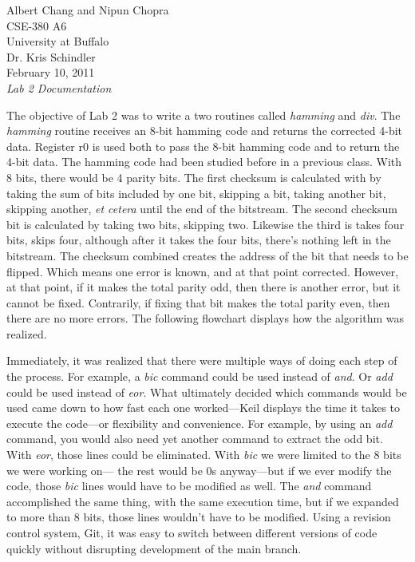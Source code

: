 \documentclass[letterpaper,10pt]{article}
\begin{document}
    Albert Chang and Nipun Chopra\\ CSE-380 A6\\
    University at Buffalo\\
    Dr. Kris Schindler\\
    February 10, 2011\\
    \textit{Lab 2 Documentation}

    The objective of Lab 2 was to write a two routines called \textit{hamming}
    and \textit{div}. The \textit{hamming} routine receives an 8-bit hamming
    code and returns the corrected 4-bit data. Register r0 is used both to
    pass the 8-bit hamming code and to return the 4-bit data. The hamming
    code had been studied before in a previous class. With 8 bits, there would
    be 4 parity bits. The first checksum is calculated with by taking the
    sum of bits included by one bit, skipping a bit, taking another bit,
    skipping another, \textit{et cetera} until the end of the bitstream. The
    second checksum bit is calculated by taking two bits, skipping two.
    Likewise the third is takes four bits, skips four, although after it takes
    the four bits, there's nothing left in the bitstream. The checksum combined
    creates the address of the bit that needs to be flipped. Which means one
    error is known, and at that point corrected. However, at that point, if
    it makes the total parity odd, then there is another error, but it cannot
    be fixed. Contrarily, if fixing that bit makes the total parity even, then
    there are no more errors. The following flowchart displays how the
    algorithm was realized.

    Immediately, it was realized that there were multiple ways of doing each
    step of the process. For example, a \textit{bic} command could be used
    instead of \textit{and}. Or \textit{add} could be used instead of
    \textit{eor}. What ultimately decided which commands would be used came
    down to how fast each one worked---Keil displays the time it takes to
    execute the code---or flexibility and convenience. For example, by
    using an \textit{add} command, you would also need yet another command to
    extract the odd bit. With \textit{eor}, those lines could be eliminated.
    With \textit{bic} we were limited to the 8 bits we were working on---
    the rest would be 0s anyway---but if we ever modify the code, those
    \textit{bic} lines would have to be modified as well. The \textit{and}
    command accomplished the same thing, with the same execution time, but if
    we expanded to more than 8 bits, those lines wouldn't have to be modified.
    Using a revision control system, Git, it was easy to switch between
    different versions of code quickly without disrupting development of the
    main branch.
\end{document}

